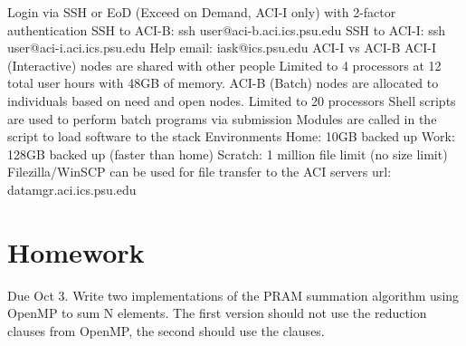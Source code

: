 \documentclass[a4paper, 11pt]{article}
\begin{document}
\begin{outline}
	\1 Login via SSH or EoD (Exceed on Demand, ACI-I only) with 2-factor authentication
		\2 SSH to ACI-B: ssh user@aci-b.aci.ics.psu.edu
		\2 SSH to ACI-I: ssh user@aci-i.aci.ics.psu.edu
	\1 Help email: iask@ics.psu.edu
	\1 ACI-I vs ACI-B
		\2 ACI-I (Interactive) nodes are shared with other people
			\3 Limited to 4 processors at 12 total user hours with 48GB of memory.
		\2 ACI-B (Batch) nodes are allocated to individuals based on need and open nodes.
			\3 Limited to 20 processors
			\3 Shell scripts are used to perform batch programs via submission
			\3 Modules are called in the script to load software to the stack
	\1 Environments
		\2 Home: 10GB backed up
		\2 Work: 128GB backed up (faster than home)
		\2 Scratch: 1 million file limit (no size limit)
	\1 Filezilla/WinSCP can be used for file transfer to the ACI servers
		\2 url: datamgr.aci.ics.psu.edu
\end{outline}

\section*{Homework}
\begin{outline}
	\1 Due Oct 3.
	\1 Write two implementations of the PRAM summation algorithm using OpenMP to sum N elements.
		\2 The first version should not use the reduction clauses from OpenMP, the second should use the clauses.
\end{outline}
\end{document}
